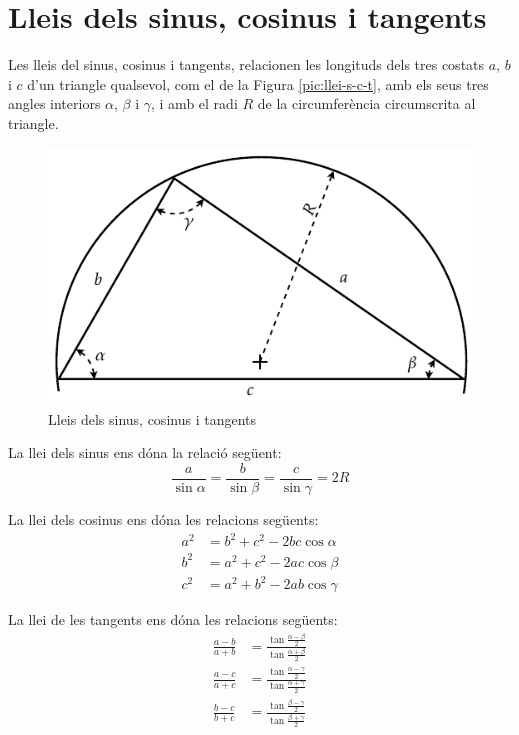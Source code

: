 \section{Lleis dels sinus, cosinus i tangents}\label{sec:llei-s-c-t}

Les lleis del sinus, cosinus i tangents, relacionen les longituds
dels tres costats $a$, $b$ i $c$ d'un triangle qualsevol, com el de
la Figura \vref{pic:llei-s-c-t}, amb els seus tres angles interiors
$\alpha$, $\beta$ i $\gamma$, i amb el radi $R$ de la circumfer\`{e}ncia circumscrita al triangle.

\begin{figure}[htb]
\centering
    \includegraphics{Imatges/Ape-Trigonometria-Triangle.pdf}
\caption{Lleis dels sinus, cosinus i tangents} \label{pic:llei-s-c-t}
\end{figure}

La llei dels sinus ens d\'{o}na la relaci\'{o} seg\"{u}ent:
\begin{equation}
    \frac{a}{\sin\alpha} = \frac{b}{\sin\beta} =
    \frac{c}{\sin\gamma} = 2 R
\end{equation}

La llei dels cosinus ens d\'{o}na les relacions seg\"{u}ents:
\begin{subequations}
\begin{align}
    a^2 &= b^2 + c^2 - 2 b c \cos\alpha \\[1ex]
    b^2 &= a^2 + c^2 - 2 a c \cos\beta \\[1ex]
    c^2 &= a^2 + b^2 - 2 a b \cos\gamma
\end{align}
\end{subequations}

La llei de les tangents ens d\'{o}na les relacions seg\"{u}ents:
\begin{subequations}
\begin{align}
    \frac{a-b}{a+b} &= \frac{\tan\frac{\alpha-\beta}{2}}{\tan\frac{\alpha+\beta}{2}} \\[1ex]
    \frac{a-c}{a+c} &= \frac{\tan\frac{\alpha-\gamma}{2}}{\tan\frac{\alpha+\gamma}{2}} \\[1ex]
    \frac{b-c}{b+c} &= \frac{\tan\frac{\beta-\gamma}{2}}{\tan\frac{\beta+\gamma}{2}}
\end{align}
\end{subequations}

